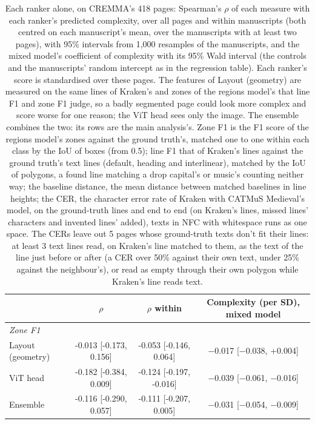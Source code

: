 \begin{table}[htbp]
  \centering
  \caption{Each ranker alone, on CREMMA's 418 pages: Spearman's $\rho$ of each measure with each ranker's predicted complexity, over all pages and within manuscripts (both centred on each manuscript's mean, over the manuscripts with at least two pages), with 95\% intervals from 1,000 resamples of the manuscripts, and the mixed model's coefficient of complexity with its 95\% Wald interval (the controls and the manuscripts' random intercept as in the regression table). Each ranker's score is standardised over these pages. The features of Layout (geometry) are measured on the same lines of Kraken's and zones of the regions model's that line F1 and zone F1 judge, so a badly segmented page could look more complex and score worse for one reason; the ViT head sees only the image. The ensemble combines the two: its rows are the main analysis's. Zone F1 is the F1 score of the regions model's zones against the ground truth's, matched one to one within each class by the IoU of boxes (from 0.5); line F1 that of Kraken's lines against the ground truth's text lines (default, heading and interlinear), matched by the IoU of polygons, a found line matching a drop capital's or music's counting neither way; the baseline distance, the mean distance between matched baselines in line heights; the CER, the character error rate of Kraken with CATMuS Medieval's model, on the ground-truth lines and end to end (on Kraken's lines, missed lines' characters and invented lines' added), texts in NFC with whitespace runs as one space. The CERs leave out 5 pages whose ground-truth texts don't fit their lines: at least 3 text lines read, on Kraken's line matched to them, as the text of the line just before or after (a CER over 50\% against their own text, under 25\% against the neighbour's), or read as empty through their own polygon while Kraken's line reads text.}
  \label{tab:difficulty_by_ranker}
  \begin{tabular}{lccc}
    \toprule
     & $\rho$ & $\rho$ within & Complexity (per SD), mixed model \\
    \midrule
    \textit{Zone F1} &  &  &  \\
    Layout (geometry) & -0.013 [-0.173, 0.156] & -0.053 [-0.146, 0.064] & $-$0.017 [$-$0.038, +0.004] \\
    ViT head & -0.182 [-0.384, 0.009] & -0.124 [-0.197, -0.016] & $-$0.039 [$-$0.061, $-$0.016] \\
    Ensemble & -0.116 [-0.290, 0.057] & -0.111 [-0.207, 0.005] & $-$0.031 [$-$0.054, $-$0.009] \\

\end{tabular}
\end{table}
